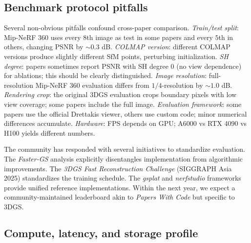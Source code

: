 \documentclass{article}
\begin{document}
\subsection{Benchmark protocol pitfalls}\label{benchmark-protocol-pitfalls}

Several non-obvious pitfalls confound cross-paper comparison. \emph{Train/test split}: Mip-NeRF 360 uses every \(8\)th image as test in some papers and every \(5\)th in others, changing PSNR by \(\sim 0.3\) dB. \emph{COLMAP version}: different COLMAP versions produce slightly different SfM points, perturbing initialization. \emph{SH degree}: papers sometimes report PSNR with SH degree \(0\) (no view dependence) for ablations; this should be clearly distinguished. \emph{Image resolution}: full-resolution Mip-NeRF 360 evaluation differs from \(1/4\)-resolution by \(\sim 1.0\) dB. \emph{Rendering crop}: the original 3DGS evaluation crops boundary pixels with low view coverage; some papers include the full image. \emph{Evaluation framework}: some papers use the official Drettakis viewer, others use custom code; minor numerical differences accumulate. \emph{Hardware}: FPS depends on GPU; A6000 vs RTX 4090 vs H100 yields different numbers.

The community has responded with several initiatives to standardize evaluation. The \emph{Faster-GS} analysis \cite{hahlbohm2026fastergsanalyzinga} explicitly disentangles implementation from algorithmic improvements. The \emph{3DGS Fast Reconstruction Challenge} (SIGGRAPH Asia 2025) standardizes the training schedule. The \emph{gsplat} and \emph{nerfstudio} frameworks provide unified reference implementations. Within the next year, we expect a community-maintained leaderboard akin to \emph{Papers With Code} but specific to 3DGS.

\subsection{Compute, latency, and storage profile}\label{compute-latency-and-storage-profile}
\end{document}

